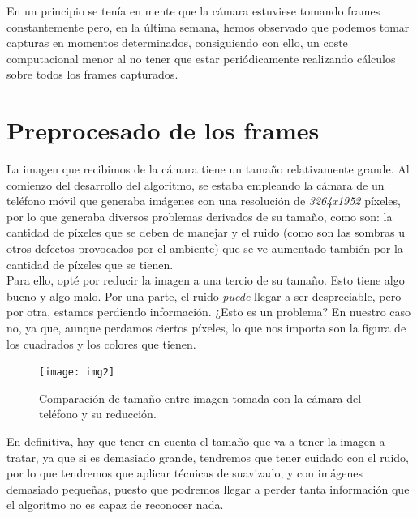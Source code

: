 \documentclass[11pt]{article}
\begin{document}
\noindent En un principio se tenía en mente que la cámara estuviese tomando frames constantemente pero, en la última semana, hemos observado que podemos tomar capturas en momentos determinados, consiguiendo con ello, un coste computacional menor al no tener que estar periódicamente realizando cálculos sobre todos los frames capturados.

\section{Preprocesado de los frames}
La imagen que recibimos de la cámara tiene un tamaño relativamente grande. Al comienzo del desarrollo del algoritmo, se estaba empleando la cámara de un teléfono móvil que generaba imágenes con una resolución de \textit{3264x1952} píxeles, por lo que generaba diversos problemas derivados de su tamaño, como son: la cantidad de píxeles que se deben de manejar y el ruido (como son las sombras u otros defectos provocados por el ambiente) que se ve aumentado también por la cantidad de píxeles que se tienen.
\\
Para ello, opté por reducir la imagen a una tercio de su tamaño. Esto tiene algo bueno y algo malo. Por una parte, el ruido \textit{puede} llegar a ser despreciable, pero por otra, estamos perdiendo información. ¿Esto es un problema? En nuestro caso no, ya que, aunque perdamos ciertos píxeles, lo que nos importa son la figura de los cuadrados y los colores que tienen.
\newpage

\begin{figure}[h!]
  \centering
      \texttt{[image: img2]}
  \caption{Comparación de tamaño entre imagen tomada con la cámara del teléfono y su reducción.}
\end{figure}

\noindent En definitiva, hay que tener en cuenta el tamaño que va a tener la imagen a tratar, ya que si es demasiado grande, tendremos que tener cuidado con el ruido, por lo que tendremos que aplicar técnicas de suavizado, y con imágenes demasiado pequeñas, puesto que podremos llegar a perder tanta información que el algoritmo no es capaz de reconocer nada.
\end{document}
